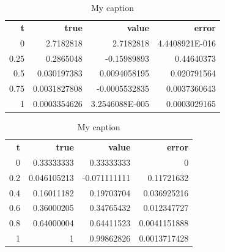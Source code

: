 \documentclass{article}
\begin{document}
\begin{table}[]
\centering
\caption{My caption}
\label{my-label}
\begin{tabular}{rrrr}
\textbf{t} & \textbf{true} & \textbf{value} & \textbf{error} \\
0          & 2.7182818     & 2.7182818      & 4.4408921E-016 \\
0.25       & 0.2865048     & -0.15989893    & 0.44640373     \\
0.5        & 0.030197383   & 0.0094058195   & 0.020791564    \\
0.75       & 0.0031827808  & -0.0005532835  & 0.0037360643   \\
1          & 0.0003354626  & 3.2546088E-005 & 0.0003029165   
\end{tabular}
\end{table}

\begin{table}[]
\centering
\caption{My caption}
\label{my-label}
\begin{tabular}{rrrr}
\textbf{t} & \textbf{true} & \textbf{value} & \textbf{error} \\
0          & 0.33333333    & 0.33333333     & 0              \\
0.2        & 0.046105213   & -0.071111111   & 0.11721632     \\
0.4        & 0.16011182    & 0.19703704     & 0.036925216    \\
0.6        & 0.36000205    & 0.34765432     & 0.012347727    \\
0.8        & 0.64000004    & 0.64411523     & 0.0041151888   \\
1          & 1             & 0.99862826     & 0.0013717428  
\end{tabular}
\end{table}

\newpage


\end{document}
